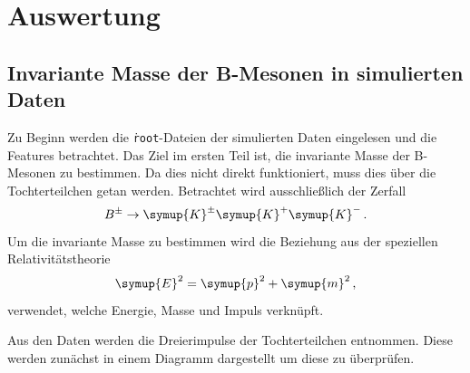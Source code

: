 \section{Auswertung}
\label{sec:auswertung}
\subsection{Invariante Masse der B-Mesonen in simulierten Daten}

Zu Beginn werden die \texttt{\.root}-Dateien der simulierten Daten eingelesen und die Features betrachtet.
Das Ziel im ersten Teil ist, die invariante Masse der B-Mesonen zu bestimmen. Da dies nicht direkt funktioniert, muss dies \"uber die Tochterteilchen getan werden.
Betrachtet wird ausschlie\ss lich der Zerfall
\begin{equation}
  B^{\pm} \to \symup{K}^{\pm} \symup{K}^{+} \symup{K}^{-}\,.
\end{equation}
Um die invariante Masse zu bestimmen wird die Beziehung aus der speziellen Relativit\"atstheorie
\begin{equation}
  \symup{E}^2 = \symup{p}^2 + \symup{m}^2\,,
  \label{eqn:relativityEQ}
\end{equation}
verwendet, welche Energie, Masse und Impuls verkn\"upft.

Aus den Daten werden die Dreierimpulse der Tochterteilchen entnommen.
Diese werden zunächst in einem Diagramm dargestellt um diese zu überprüfen.

